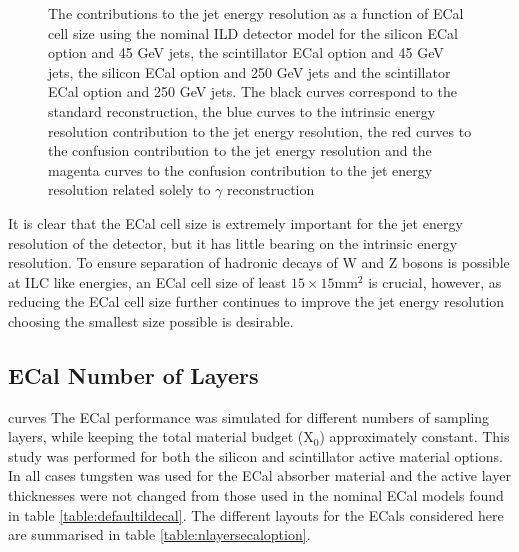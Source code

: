 \begin{figure}[h!]
\caption[The contributions to the jet energy resolution as a function of ECal cell size using the nominal ILD detector model for \protect{} the silicon ECal option and 45 GeV jets, \protect{} the scintillator ECal option and 45 GeV jets, \protect{} the silicon ECal option and 250 GeV jets and \protect{} the scintillator ECal option and 250 GeV jets.  The black curves correspond to the standard reconstruction, the blue curves to the intrinsic energy resolution contribution to the jet energy resolution, the red curves to the confusion contribution to the jet energy resolution and the magenta curves to the confusion contribution to the jet energy resolution related solely to $\gamma$ reconstruction.]{The contributions to the jet energy resolution as a function of ECal cell size using the nominal ILD detector model for \protect{} the silicon ECal option and 45 GeV jets, \protect{} the scintillator ECal option and 45 GeV jets, \protect{} the silicon ECal option and 250 GeV jets and \protect{} the scintillator ECal option and 250 GeV jets.  The black curves correspond to the standard reconstruction, the blue curves to the intrinsic energy resolution contribution to the jet energy resolution, the red curves to the confusion contribution to the jet energy resolution and the magenta curves to the confusion contribution to the jet energy resolution related solely to $\gamma$ reconstruction}
\label{fig:ecalcellsizebreak}
\end{figure}

It is clear that the ECal cell size is extremely important for the jet energy resolution of the detector, but it has little bearing on the intrinsic energy resolution.  To ensure separation of hadronic decays of W and Z bosons is possible at ILC like energies, an ECal cell size of least $15 \times 15 \text{mm}^{2}$ is crucial, however, as reducing the ECal cell size further continues to improve the jet energy resolution choosing the smallest size possible is desirable.   


\subsection{ECal Number of Layers}curves 
\label{sec:ecalnlayers}
The ECal performance was simulated for different numbers of sampling layers, while keeping the total material budget ($\text{X}_{0}$) approximately constant.  This study was performed for both the silicon and scintillator active material options.  In all cases tungsten was used for the ECal absorber material and the active layer thicknesses were not changed from those used in the nominal ECal models found in table \ref{table:defaultildecal}.  The different layouts for the ECals considered here are summarised in table \ref{table:nlayersecaloption}.  

